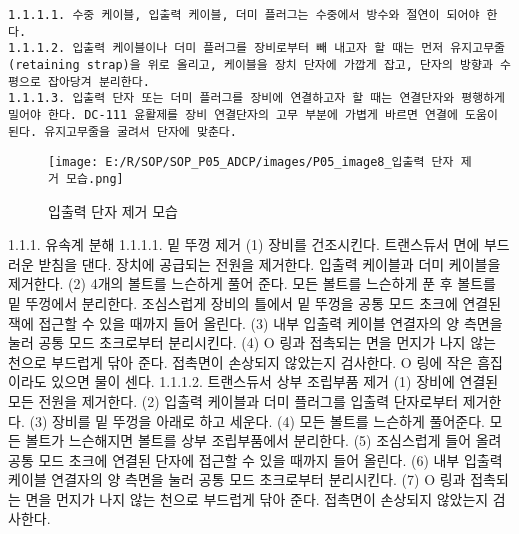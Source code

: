 \documentclass[
]{book}
\begin{document}
\begin{verbatim}
1.1.1.1. 수중 케이블, 입출력 케이블, 더미 플러그는 수중에서 방수와 절연이 되어야 한다.
1.1.1.2. 입출력 케이블이나 더미 플러그를 장비로부터 빼 내고자 할 때는 먼저 유지고무줄(retaining strap)을 위로 올리고, 케이블을 장치 단자에 가깝게 잡고, 단자의 방향과 수평으로 잡아당겨 분리한다.
1.1.1.3. 입출력 단자 또는 더미 플러그를 장비에 연결하고자 할 때는 연결단자와 평행하게 밀어야 한다. DC-111 윤활제를 장비 연결단자의 고무 부분에 가볍게 바르면 연결에 도움이 된다. 유지고무줄을 굴려서 단자에 맞춘다.
\end{verbatim}

\begin{figure}
\centering
\texttt{[image: E:/R/SOP/SOP\_P05\_ADCP/images/P05\_image8\_입출력 단자 제거 모습.png]}
\caption{입출력 단자 제거 모습}
\end{figure}

1.1.1. 유속계 분해
1.1.1.1. 밑 뚜껑 제거
(1) 장비를 건조시킨다. 트랜스듀서 면에 부드러운 받침을 댄다. 장치에 공급되는 전원을 제거한다. 입출력 케이블과 더미 케이블을 제거한다.
(2) 4개의 볼트를 느슨하게 풀어 준다. 모든 볼트를 느슨하게 푼 후 볼트를 밑 뚜껑에서 분리한다. 조심스럽게 장비의 틀에서 밑 뚜껑을 공통 모드 초크에 연결된 잭에 접근할 수 있을 때까지 들어 올린다.
(3) 내부 입출력 케이블 연결자의 양 측면을 눌러 공통 모드 초크로부터 분리시킨다.
(4) O 링과 접촉되는 면을 먼지가 나지 않는 천으로 부드럽게 닦아 준다. 접촉면이 손상되지 않았는지 검사한다. O 링에 작은 흠집이라도 있으면 물이 센다.
1.1.1.2. 트랜스듀서 상부 조립부품 제거
(1) 장비에 연결된 모든 전원을 제거한다.
(2) 입출력 케이블과 더미 플러그를 입출력 단자로부터 제거한다.
(3) 장비를 밑 뚜껑을 아래로 하고 세운다.
(4) 모든 볼트를 느슨하게 풀어준다. 모든 볼트가 느슨해지면 볼트를 상부 조립부품에서 분리한다.
(5) 조심스럽게 들어 올려 공통 모드 초크에 연결된 단자에 접근할 수 있을 때까지 들어 올린다.
(6) 내부 입출력 케이블 연결자의 양 측면을 눌러 공통 모드 초크로부터 분리시킨다.
(7) O 링과 접촉되는 면을 먼지가 나지 않는 천으로 부드럽게 닦아 준다. 접촉면이 손상되지 않았는지 검사한다.
\end{document}
